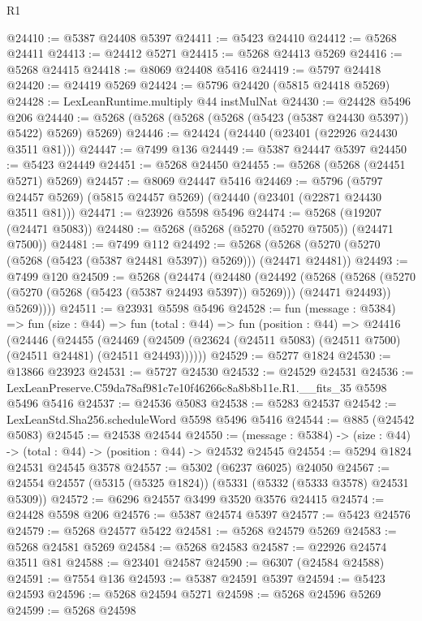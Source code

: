 \begin{lexlean}{R1}
\begin{coremodule}
@24410 := @5387 @24408 @5397
@24411 := @5423 @24410
@24412 := @5268 @24411
@24413 := @24412 @5271
@24415 := @5268 @24413 @5269
@24416 := @5268 @24415
@24418 := @8069 @24408 @5416
@24419 := @5797 @24418
@24420 := @24419 @5269
@24424 := @5796 @24420 (@5815 @24418 @5269)
@24428 := LexLeanRuntime.multiply @44 instMulNat
@24430 := @24428 @5496 @206
@24440 := @5268 (@5268 (@5268 (@5268 (@5423 (@5387 @24430 @5397)) @5422) @5269) @5269)
@24446 := @24424 (@24440 (@23401 (@22926 @24430 @3511 @81)))
@24447 := @7499 @136
@24449 := @5387 @24447 @5397
@24450 := @5423 @24449
@24451 := @5268 @24450
@24455 := @5268 (@5268 (@24451 @5271) @5269)
@24457 := @8069 @24447 @5416
@24469 := @5796
    (@5797 @24457 @5269)
    (@5815 @24457 @5269)
    (@24440 (@23401 (@22871 @24430 @3511 @81)))
@24471 := @23926 @5598 @5496
@24474 := @5268 (@19207 (@24471 @5083))
@24480 := @5268 (@5268 (@5270 (@5270 @7505)) (@24471 @7500))
@24481 := @7499 @112
@24492 := @5268 (@5268 (@5270 (@5270 (@5268 (@5423 (@5387 @24481 @5397)) @5269))) (@24471 @24481))
@24493 := @7499 @120
@24509 := @5268
    (@24474
      (@24480
        (@24492
          (@5268
            (@5268 (@5270 (@5270 (@5268 (@5423 (@5387 @24493 @5397)) @5269))) (@24471 @24493))
            @5269))))
@24511 := @23931 @5598 @5496
@24528 := fun (message : @5384) =>
  fun (size : @44) =>
  fun (total : @44) =>
  fun (position : @44) =>
  @24416
    (@24446
      (@24455
        (@24469 (@24509 (@23624 (@24511 @5083) (@24511 @7500) (@24511 @24481) (@24511 @24493))))))
@24529 := @5277 @1824
@24530 := @13866 @23923
@24531 := @5727 @24530
@24532 := @24529 @24531
@24536 := LexLeanPreserve.C59da78af981c7e10f46266c8a8b8b11e.R1.__fits_35 @5598 @5496 @5416
@24537 := @24536 @5083
@24538 := @5283 @24537
@24542 := LexLeanStd.Sha256.scheduleWord @5598 @5496 @5416
@24544 := @885 (@24542 @5083)
@24545 := @24538 @24544
@24550 := (message : @5384) -> (size : @44) -> (total : @44) -> (position : @44) -> @24532 @24545
@24554 := @5294 @1824 @24531 @24545 @3578
@24557 := @5302 (@6237 @6025) @24050
@24567 := @24554 @24557 (@5315 (@5325 @1824)) (@5331 (@5332 (@5333 @3578) @24531 @5309))
@24572 := @6296 @24557 @3499 @3520 @3576 @24415
@24574 := @24428 @5598 @206
@24576 := @5387 @24574 @5397
@24577 := @5423 @24576
@24579 := @5268 @24577 @5422
@24581 := @5268 @24579 @5269
@24583 := @5268 @24581 @5269
@24584 := @5268 @24583
@24587 := @22926 @24574 @3511 @81
@24588 := @23401 @24587
@24590 := @6307 (@24584 @24588)
@24591 := @7554 @136
@24593 := @5387 @24591 @5397
@24594 := @5423 @24593
@24596 := @5268 @24594 @5271
@24598 := @5268 @24596 @5269
@24599 := @5268 @24598

\end{coremodule}
\end{lexlean}
